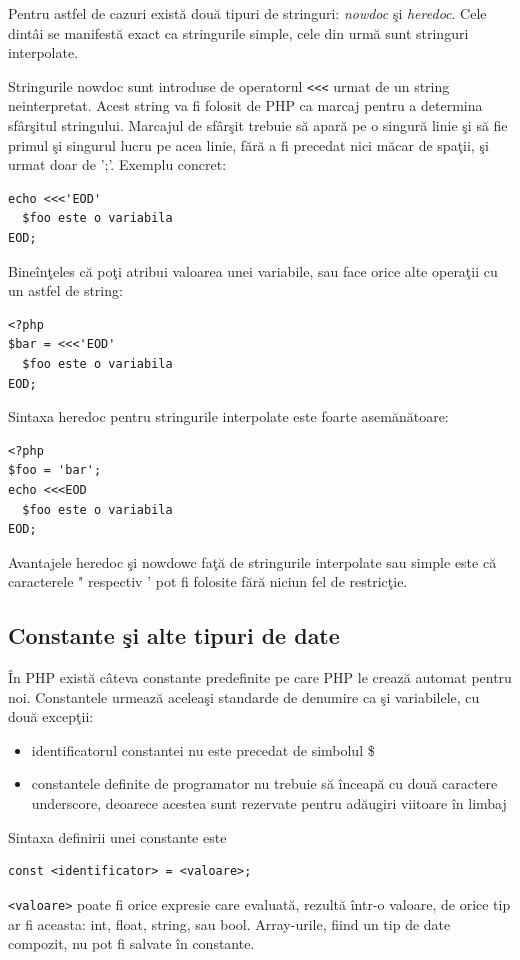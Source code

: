 Pentru astfel de cazuri există două tipuri de stringuri: \textsl{nowdoc} şi \textsl{heredoc}.
Cele dintâi se manifestă exact ca stringurile simple, cele din urmă
sunt stringuri interpolate.

Stringurile nowdoc sunt introduse de operatorul  \verb '<<<' urmat de un string neinterpretat.
Acest string va fi folosit de PHP ca marcaj pentru a determina sfârşitul stringului. Marcajul de sfârşit trebuie
să apară pe o singură linie şi să fie primul şi singurul lucru pe acea linie, fără a fi precedat nici măcar
de spaţii, şi urmat doar de ';'. Exemplu concret:

\begin{lstlisting}
echo <<<'EOD'
  $foo este o variabila 
EOD;
\end{lstlisting}

Bineînţeles că poţi atribui valoarea unei variabile, sau face orice
alte operaţii cu un astfel de string:
\begin{lstlisting}
<?php
$bar = <<<'EOD'
  $foo este o variabila
EOD;
\end{lstlisting}

Sintaxa heredoc pentru stringurile interpolate este foarte asemănătoare:
\begin{lstlisting}
<?php
$foo = 'bar';
echo <<<EOD
  $foo este o variabila 
EOD;
\end{lstlisting}

Avantajele heredoc şi nowdowc faţă de stringurile interpolate sau simple este că
caracterele " respectiv ' pot fi folosite fără niciun fel de restricţie.

\subsection{Constante şi alte tipuri de date}
În PHP există câteva constante predefinite pe care PHP le
crează automat pentru noi. Constantele urmează aceleaşi
standarde de denumire ca şi variabilele, cu două excepţii:
\begin{itemize}
	\item identificatorul constantei nu este precedat de simbolul \$
	\item constantele definite de programator nu trebuie să înceapă cu două caractere
underscore, deoarece acestea sunt rezervate pentru adăugiri viitoare în limbaj
\end{itemize}
Sintaxa definirii unei constante este
\begin{verbatim}
const <identificator> = <valoare>;
\end{verbatim}
\texttt{<valoare>} poate fi orice expresie care evaluată, rezultă într-o valoare,
de orice tip ar fi aceasta: int, float, string, sau bool. Array-urile, fiind un tip
de date compozit, nu pot fi salvate în constante.

